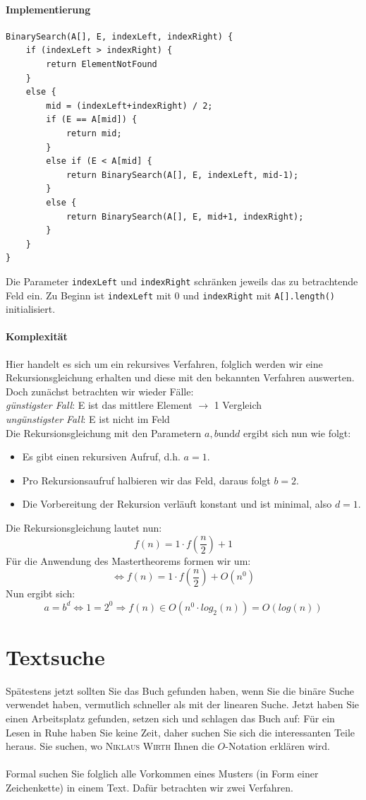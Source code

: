 \documentclass[11pt,a4paper]{scrartcl}
\begin{document}
\paragraph{Implementierung}
\begin{lstlisting}
BinarySearch(A[], E, indexLeft, indexRight) {
	if (indexLeft > indexRight) {
		return ElementNotFound	
	}
	else {
		mid = (indexLeft+indexRight) / 2;
		if (E == A[mid]) {
			return mid;		
		}
		else if (E < A[mid] {
			return BinarySearch(A[], E, indexLeft, mid-1);	
		}
		else {
			return BinarySearch(A[], E, mid+1, indexRight);	
		}
	}
}
\end{lstlisting} 
Die Parameter \texttt{indexLeft} und \texttt{indexRight} schränken jeweils das zu betrachtende Feld ein. Zu Beginn ist \texttt{indexLeft} mit $0$ und \texttt{indexRight} mit \texttt{A[].length()} initialisiert. 
\paragraph{Komplexität}
Hier handelt es sich um ein rekursives Verfahren, folglich werden wir eine Rekursionsgleichung erhalten und diese mit den bekannten Verfahren auswerten. Doch zunächst betrachten wir wieder Fälle: \\
\textit{günstigster Fall}: \quad E ist das mittlere Element $\to$ 1 Vergleich\\
\textit{ungünstigster Fall}: \quad E ist nicht im Feld \\
Die Rekursionsgleichung mit den Parametern $a, b \text{und} d$ ergibt sich nun wie folgt:
\begin{itemize}
\item Es gibt einen rekursiven Aufruf, d.h. $a = 1$.
\item Pro Rekursionsaufruf halbieren wir das Feld, daraus folgt $b = 2$.
\item Die Vorbereitung der Rekursion verläuft konstant und ist minimal, also $d = 1$.
\end{itemize}
Die Rekursionsgleichung lautet nun: 
\[f(n) = 1 \cdot f(\frac{n}{2}) + 1\]
Für die Anwendung des Mastertheorems formen wir um:
\[\iff f(n) = 1 \cdot f(\frac{n}{2}) + O(n^{0})\]
Nun ergibt sich: 
\[a = b^{d} \iff 1 = 2^{0} \Rightarrow f(n) \in O(n^{0} \cdot log_{2}(n)) = O(log(n))\]
\section{Textsuche}
Spätestens jetzt sollten Sie das Buch gefunden haben, wenn Sie die binäre Suche verwendet haben, vermutlich schneller als mit der linearen Suche. Jetzt haben Sie einen Arbeitsplatz gefunden, setzen sich und schlagen das Buch auf: Für ein Lesen in Ruhe haben Sie keine Zeit, daher suchen Sie sich die interessanten Teile heraus. Sie suchen, wo \textsc{Niklaus Wirth} Ihnen die $O$-Notation erklären wird. \\\\
Formal suchen Sie folglich alle Vorkommen eines Musters (in Form einer Zeichenkette) in einem Text. Dafür betrachten wir zwei Verfahren.
\end{document}
